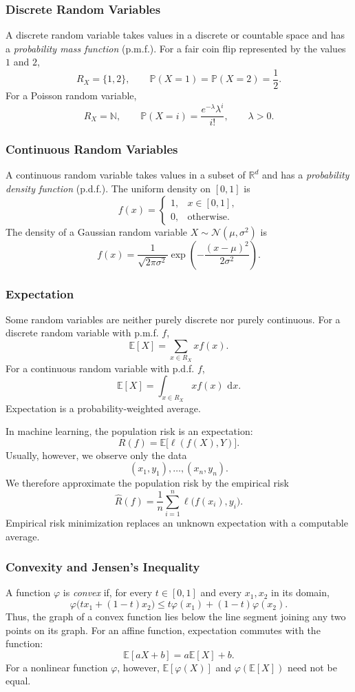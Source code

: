 \documentclass[12pt,oneside]{book}
\numberwithin{equation}{section}
\theoremstyle{definition}
\theoremstyle{plain}
\theoremstyle{remark}
\newcommand{\R}{\mathbb{R}}
\newcommand{\N}{\mathbb{N}}
\newcommand{\E}{\mathbb{E}}
\newcommand{\dd}{\,\mathrm{d}}
\newcommand{\Normal}{\mathcal{N}}
\begin{document}
\subsubsection{Discrete Random Variables}
A discrete random variable takes values in a discrete or countable space and has a \emph{probability mass function} (p.m.f.). For a fair coin flip represented by the values $1$ and $2$,
\[
R_X=\{1,2\},
\qquad
\mathbb{P}(X=1)=\mathbb{P}(X=2)=\frac{1}{2}.
\]
For a Poisson random variable,
\[
R_X=\N,
\qquad
\mathbb{P}(X=i)=\frac{e^{-\lambda}\lambda^i}{i!},
\qquad \lambda>0.
\]

\subsubsection{Continuous Random Variables}
A continuous random variable takes values in a subset of $\R^d$ and has a \emph{probability density function} (p.d.f.). The uniform density on $[0,1]$ is
\[
f(x)=
\begin{cases}
1, & x\in[0,1],\\
0, & \text{otherwise}.
\end{cases}
\]
The density of a Gaussian random variable $X\sim\Normal(\mu,\sigma^2)$ is
\[
f(x)=\frac{1}{\sqrt{2\pi\sigma^2}}
\exp\left(-\frac{(x-\mu)^2}{2\sigma^2}\right).
\]

\subsubsection{Expectation}
Some random variables are neither purely discrete nor purely continuous. For a discrete random variable with p.m.f. $f$,
\[
\E[X]=\sum_{x\in R_X}x f(x).
\]
For a continuous random variable with p.d.f. $f$,
\[
\E[X]=\int_{x\in R_X}x f(x)\,\dd x.
\]
Expectation is a probability-weighted average.

In machine learning, the population risk is an expectation:
\[
R(f)=\E\bigl[\ell(f(X),Y)\bigr].
\]
Usually, however, we observe only the data
\[
(x_1,y_1),\ldots,(x_n,y_n).
\]
We therefore approximate the population risk by the empirical risk
\[
\widehat{R}(f)
=\frac{1}{n}\sum_{i=1}^n\ell\bigl(f(x_i),y_i\bigr).
\]
Empirical risk minimization replaces an unknown expectation with a computable average.

\subsubsection{Convexity and Jensen's Inequality}
A function $\varphi$ is \emph{convex} if, for every $t\in[0,1]$ and every $x_1,x_2$ in its domain,
\[
\varphi\bigl(tx_1+(1-t)x_2\bigr)
\leq t\varphi(x_1)+(1-t)\varphi(x_2).
\]
Thus, the graph of a convex function lies below the line segment joining any two points on its graph. For an affine function, expectation commutes with the function:
\[
\E[aX+b]=a\E[X]+b.
\]
For a nonlinear function $\varphi$, however, $\E[\varphi(X)]$ and $\varphi(\E[X])$ need not be equal.
\end{document}
